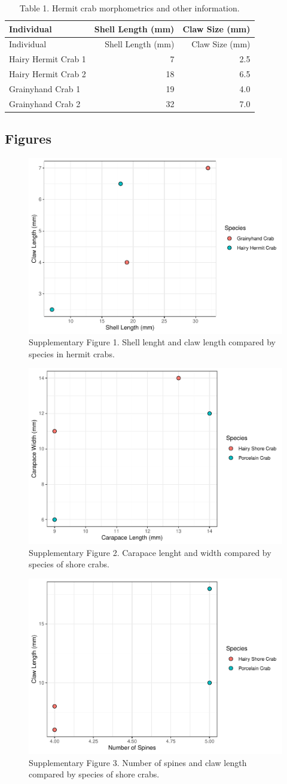 \documentclass[
]{article}
\begin{document}
\begin{longtable}[]{@{}lrr@{}}
\caption{Table 1. Hermit crab morphometrics and other
information.}\tabularnewline
\toprule
Individual & Shell Length (mm) & Claw Size (mm) \\
\midrule
\endfirsthead
\toprule
Individual & Shell Length (mm) & Claw Size (mm) \\
\midrule
\endhead
Hairy Hermit Crab 1 & 7 & 2.5 \\
Hairy Hermit Crab 2 & 18 & 6.5 \\
Grainyhand Crab 1 & 19 & 4.0 \\
Grainyhand Crab 2 & 32 & 7.0 \\
\bottomrule
\end{longtable}

\hypertarget{figures-2}{%
\subsection{Figures}\label{figures-2}}

\begin{figure}
\includegraphics[width=0.5\linewidth,height=0.5\textheight]{species-id-crabs_files/figure-latex/unnamed-chunk-3-1} \caption{Supplementary Figure 1. Shell lenght and claw length compared by species in hermit crabs.}\label{fig:unnamed-chunk-3}
\end{figure}

\begin{figure}
\includegraphics[width=0.5\linewidth,height=0.5\textheight]{species-id-crabs_files/figure-latex/unnamed-chunk-4-1} \caption{Supplementary Figure 2. Carapace lenght and width compared by species of shore crabs.}\label{fig:unnamed-chunk-4}
\end{figure}

\begin{figure}
\includegraphics[width=0.5\linewidth,height=0.5\textheight]{species-id-crabs_files/figure-latex/unnamed-chunk-5-1} \caption{Supplementary Figure 3. Number of spines and claw length compared by species of shore crabs.}\label{fig:unnamed-chunk-5}
\end{figure}
\end{document}
